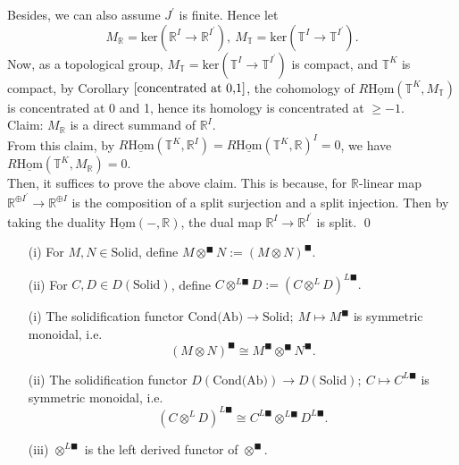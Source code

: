 \documentclass[UTF8,12,a4paper]{ctexart}
\theoremstyle{definition}
\begin{document}
Besides, we can also assume $J^\prime$ is finite. Hence let
$$
M_\mathbb{R}=\text{ker}(\mathbb{R}^{I}\rightarrow \mathbb{R}^{I^\prime }),\ M_\mathbb{T}=\text{ker}(\mathbb{T}^{I}\rightarrow \mathbb{T}^{I^\prime }).
$$
Now, as a topological group, $M_\mathbb{T}=\text{ker}(\mathbb{T}^{I}\rightarrow \mathbb{T}^{I^\prime })$ is compact, and $\mathbb{T}^K$ is compact, by Corollary $\ref{concentrated at 0,1}$, the cohomology of $R\underline{\text{Hom}}(\mathbb{T}^K,M_\mathbb{T})$ is concentrated at 0 and 1, hence its homology is concentrated at $\geq -1$.\\
Claim: $M_\mathbb{R}$ is a direct summand of $\mathbb{R}^I$.\\
From this claim, by $R\underline{\text{Hom}}(\mathbb{T}^K,\mathbb{R}^I)=R\underline{\text{Hom}}(\mathbb{T}^K,\mathbb{R})^I=0$, we have $R\underline{\text{Hom}}(\mathbb{T}^K,M_\mathbb{R})=0.$\\
Then, it suffices to prove the above claim. This is because, for $\mathbb{R}$-linear map $\mathbb{R}^{\oplus I^\prime}\rightarrow \mathbb{R}^{\oplus I}$ is the composition of a split surjection and a  split injection. Then by taking the duality $\underline{\text{Hom}}(-,\mathbb{R})$, the dual map $\mathbb{R}^I\rightarrow \mathbb{R}^{I^\prime}$ is split.
\qed














\newpage
\dfn 
\begin{itemize}
	\item [(i)]For $M, N\in\text{Solid}$, define $M\otimes^\blacksquare N:=(M\otimes N)^\blacksquare.$
	\item [(ii)]For $C, D\in D(\text{Solid})$, define $C\otimes^{L\blacksquare} D:=(C\otimes^L D)^{L\blacksquare}.$
\end{itemize}

\thm 
\begin{itemize}
	\item [(i)] The solidification functor $\text{Cond(Ab)}\rightarrow \text{Solid};\ M\mapsto M^\blacksquare$ is symmetric monoidal, i.e.
	$$
	(M\otimes N)^\blacksquare\cong M^\blacksquare \otimes^\blacksquare N^\blacksquare.
	$$
	\item [(ii)]
	 The solidification functor $D(\text{Cond(Ab)})\rightarrow D(\text{Solid});\ C\mapsto C^{L\blacksquare}$ is symmetric monoidal, i.e.
	$$
	(C\otimes^L D)^{L\blacksquare}\cong C^{L\blacksquare} \otimes^{L\blacksquare} D^{L\blacksquare}.
	$$
	\item [(iii)]$\otimes^{L\blacksquare}$ is the left derived functor of $\otimes^{\blacksquare}$.
\end{itemize}
\end{document}
